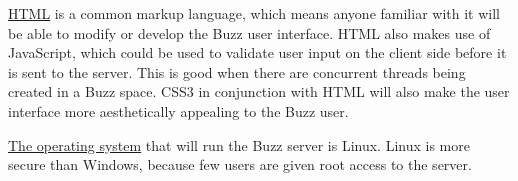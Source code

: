 \documentclass{article}
\begin{document}
\underline{HTML} is a common markup language, which means anyone familiar with it will be able to modify or develop the Buzz user interface. HTML also makes use of JavaScript, which could be used to validate user input on the client side before it is sent to the server. This is good when there are concurrent threads being created in  a Buzz space. CSS3 in conjunction with HTML will also make the user interface more aesthetically appealing to the Buzz user.\\ \par 
\underline{The operating system} that will run the Buzz server is Linux. Linux is more secure than Windows, because few users are given root access to the server.
\end{document}
